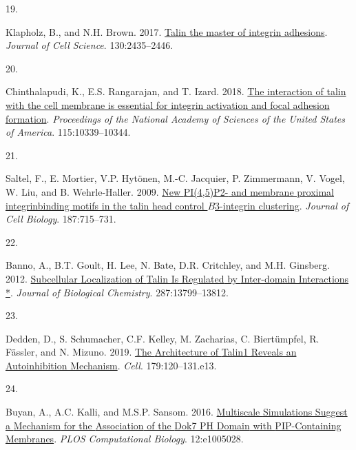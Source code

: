 \documentclass[
  letterpaper,
  DIV=11,
  numbers=noendperiod]{scrartcl}
\newlength{\cslhangindent}
\newlength{\csllabelwidth}
\newlength{\cslentryspacingunit} %
\newenvironment{CSLReferences}[2] %
 {%
  \setlength{\parindent}{0pt}
  \ifodd #1
  \let\oldpar\par
  \def\par{\hangindent=\cslhangindent\oldpar}
  \fi
  \setlength{\parskip}{#2\cslentryspacingunit}
 }%
 {}
\newcommand{\CSLLeftMargin}[1]{\parbox[t]{\csllabelwidth}{#1}}
\newcommand{\CSLRightInline}[1]{\parbox[t]{\linewidth - \csllabelwidth}{#1}\break}
\begin{document}
\begin{CSLReferences}{0}{0}
\leavevmode{}%
\CSLLeftMargin{19. }%
\CSLRightInline{Klapholz, B., and N.H. Brown. 2017.
\href{https://doi.org/10.1242/jcs.190991}{Talin \textendash{} the master
of integrin adhesions}. \emph{Journal of Cell Science}. 130:2435--2446.}

\leavevmode{}%
\CSLLeftMargin{20. }%
\CSLRightInline{Chinthalapudi, K., E.S. Rangarajan, and T. Izard. 2018.
\href{https://doi.org/10.1073/pnas.1806275115}{The interaction of talin
with the cell membrane is essential for integrin activation and focal
adhesion formation}. \emph{Proceedings of the National Academy of
Sciences of the United States of America}. 115:10339--10344.}

\leavevmode{}%
\CSLLeftMargin{21. }%
\CSLRightInline{Saltel, F., E. Mortier, V.P. Hytönen, M.-C. Jacquier, P.
Zimmermann, V. Vogel, W. Liu, and B. Wehrle-Haller. 2009.
\href{https://doi.org/10.1083/jcb.200908134}{New {PI}(4,5){P2-} and
membrane proximal integrin\textendash binding motifs in the talin head
control {\(B\)}3-integrin clustering}. \emph{Journal of Cell Biology}.
187:715--731.}

\leavevmode{}%
\CSLLeftMargin{22. }%
\CSLRightInline{Banno, A., B.T. Goult, H. Lee, N. Bate, D.R. Critchley,
and M.H. Ginsberg. 2012.
\href{https://doi.org/10.1074/jbc.M112.341214}{Subcellular
{Localization} of {Talin Is Regulated} by {Inter-domain Interactions}
*}. \emph{Journal of Biological Chemistry}. 287:13799--13812.}

\leavevmode{}%
\CSLLeftMargin{23. }%
\CSLRightInline{Dedden, D., S. Schumacher, C.F. Kelley, M. Zacharias, C.
Biertümpfel, R. Fässler, and N. Mizuno. 2019.
\href{https://doi.org/10.1016/j.cell.2019.08.034}{The {Architecture} of
{Talin1 Reveals} an {Autoinhibition Mechanism}}. \emph{Cell}.
179:120--131.e13.}

\leavevmode{}%
\CSLLeftMargin{24. }%
\CSLRightInline{Buyan, A., A.C. Kalli, and M.S.P. Sansom. 2016.
\href{https://doi.org/10.1371/journal.pcbi.1005028}{Multiscale
{Simulations Suggest} a {Mechanism} for the {Association} of the {Dok7
PH Domain} with {PIP-Containing Membranes}}. \emph{PLOS Computational
Biology}. 12:e1005028.}


\end{CSLReferences}
\end{document}
